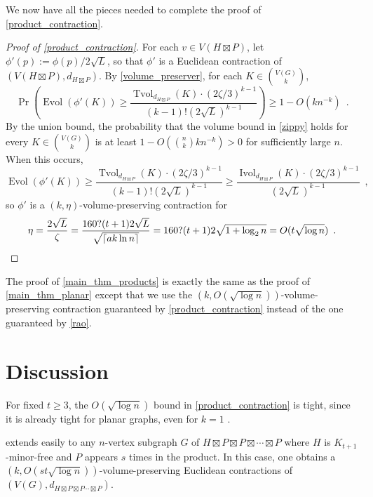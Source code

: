 \documentclass{patmorin}
\renewcommand{\ge}{\geqslant}
\DeclareMathOperator{\evol}{Evol}
\DeclareMathOperator{\ivol}{Ivol}
\DeclareMathOperator{\tvol}{Tvol}
\begin{document}
We now have all the pieces needed to complete the proof of \cref{product_contraction}.

\begin{proof}[Proof of \cref{product_contraction}]
  For each $v\in V(H\boxtimes P)$, let $\phi'(p):=\phi(p)/2\sqrt{L}$, so that $\phi'$ is a Euclidean contraction of $(V(H\boxtimes P),d_{H\boxtimes P})$.  By \cref{volume_preserver}, for each $K\in \binom{V(G)}{k}$,
  \begin{equation}
    \Pr\left(\evol(\phi'(K)) \ge \frac{\tvol_{d_{H\boxtimes P}}(K)\cdot(2\zeta/3)^{k-1}}{(k-1)!(2\sqrt{L})^{k-1}}\right) \ge 1- O(kn^{-k}) \enspace .
    \label{zippy}
  \end{equation}
  By the union bound, the probability that the volume bound in \cref{zippy} holds for every $K\in\binom{V(G)}{k}$ is at least $1-O(\binom{n}{k}kn^{-k}) > 0$ for sufficiently large $n$.  When this occurs,
  \[
    \evol(\phi'(K)) \ge \frac{\tvol_{d_{H\boxtimes P}}(K)\cdot(2\zeta/3)^{k-1}}{(k-1)!(2\sqrt{L})^{k-1}} \ge
    \frac{\ivol_{d_{H\boxtimes P}}(K)\cdot(2\zeta/3)^{k-1}}{(2\sqrt{L})^{k-1}} \enspace ,
  \]
  so $\phi'$ is a $(k,\eta)$-volume-preserving contraction for
  \[
    \eta = \frac{2\sqrt{L}}{\zeta} = \frac{160?(t+1)2\sqrt{L}}{\sqrt{\lceil ak\ln n\rceil}} = {160?(t+1)2\sqrt{1+\log_2 n}} = O(t\sqrt{\log n}) \enspace . \qedhere
  \]
\end{proof}

The proof of \cref{main_thm_products} is exactly the same as the proof of \cref{main_thm_planar} except that we use the $(k,O(\sqrt{\log n}))$-volume-preserving contraction guaranteed by \cref{product_contraction} instead of the one guaranteed by \cref{rao}.

\section{Discussion}

For fixed $t\ge 3$, the $O(\sqrt{\log n})$ bound in \cref{product_contraction} is tight, since it is already tight for planar graphs, even for $k=1$ \cite{?}.

 extends easily to any $n$-vertex subgraph $G$ of $H\boxtimes P\boxtimes P\boxtimes\cdots\boxtimes P$ where $H$ is $K_{t+1}$-minor-free and $P$ appears $s$ times in the product.  In this case, one obtains a $(k,O(st\sqrt{\log n}))$-volume-preserving Euclidean contractions of $(V(G),d_{H\boxtimes P\boxtimes P\cdots\boxtimes P})$.
\end{document}
